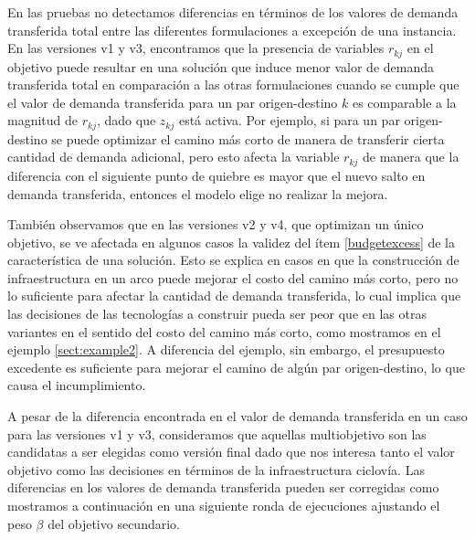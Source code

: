 En las pruebas no detectamos diferencias en términos de los valores de demanda transferida total entre las diferentes formulaciones a excepción de una instancia. En las versiones v1 y v3, encontramos que la presencia de variables $r_{kj}$ en el objetivo puede resultar en una solución que induce menor valor de demanda transferida total en comparación a las otras formulaciones cuando se cumple que el valor de demanda transferida para un par origen-destino $k$ es comparable a la magnitud de $r_{kj}$, dado que $z_{kj}$ está activa. Por ejemplo, si para un par origen-destino se puede optimizar el camino más corto de manera de transferir cierta cantidad de demanda adicional, pero esto afecta la variable $r_{kj}$ de manera que la diferencia con el siguiente punto de quiebre es mayor que el nuevo salto en demanda transferida, entonces el modelo elige no realizar la mejora.

También observamos que en las versiones v2 y v4, que optimizan un único objetivo, se ve afectada en algunos casos la validez del ítem \ref{budgetexcess} de la característica de una solución. Esto se explica en casos en que la construcción de infraestructura en un arco puede mejorar el costo del camino más corto, pero no lo suficiente para afectar la cantidad de demanda transferida, lo cual implica que las decisiones de las tecnologías a construir pueda ser peor que en las otras variantes en el sentido del costo del camino más corto, como mostramos en el ejemplo \ref{sect:example2}. A diferencia del ejemplo, sin embargo, el presupuesto excedente es suficiente para mejorar el camino de algún par origen-destino, lo que causa el incumplimiento.

A pesar de la diferencia encontrada en el valor de demanda transferida en un caso para las versiones v1 y v3, consideramos que aquellas multiobjetivo son las candidatas a ser elegidas como versión final dado que nos interesa tanto el valor objetivo como las decisiones en términos de la infraestructura ciclovía. Las diferencias en los valores de demanda transferida pueden ser corregidas como mostramos a continuación en una siguiente ronda de ejecuciones ajustando el peso $\beta$ del objetivo secundario.

